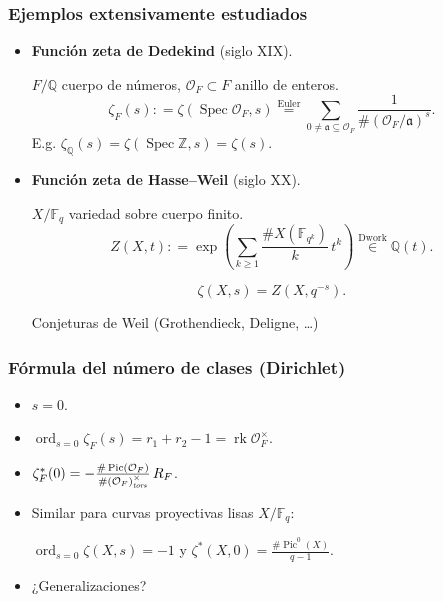 \documentclass[handout]{beamer}
\newcommand{\FF}{\mathbb{F}}
\newcommand{\QQ}{\mathbb{Q}}
\newcommand{\ZZ}{\mathbb{Z}}
\newcommand{\dfn}{\mathrel{\mathop:}=}
\DeclareMathOperator{\ord}{ord}
\DeclareMathOperator{\Pic}{Pic}
\DeclareMathOperator{\rk}{rk}
\DeclareMathOperator{\Spec}{Spec}
\newcommand{\tors}{\text{\it tors}}
\begin{document}
\begin{frame}
  \frametitle{Ejemplos extensivamente estudiados}

  \begin{itemize}
  \item<2-> \textbf{Función zeta de Dedekind} (siglo XIX).

    $F/\QQ$ cuerpo de números, $\mathcal{O}_F \subset F$ anillo de enteros.
    \[ \zeta_F (s) \dfn \zeta (\Spec \mathcal{O}_F, s) \stackrel{\text{Euler}}{=} \sum_{0 \ne \mathfrak{a} \subseteq \mathcal{O}_F} \frac{1}{\# (\mathcal{O}_F/\mathfrak{a})^s}. \]
    E.g. $\zeta_\QQ (s) = \zeta (\Spec \ZZ, s) = \zeta (s)$.

  \item<3-> \textbf{Función zeta de Hasse--Weil} (siglo XX).

    $X/\FF_q$ variedad sobre cuerpo finito.
    \[ Z (X,t) \dfn \exp \left(\sum_{k\ge 1} \frac{\# X (\FF_{q^k})}{k}\,t^k\right) \stackrel{\text{Dwork}}{\in} \QQ (t). \]

    \[ \zeta (X,s) = Z (X,q^{-s}). \]

    Conjeturas de Weil (Grothendieck, Deligne, \dots)
  \end{itemize}
\end{frame}


\begin{frame}
  \frametitle{Fórmula del número de clases (Dirichlet)}

  \begin{itemize}
  \item<2-> $s = 0$.

  \item<3-> $\ord_{s = 0} \zeta_F (s) = r_1 + r_2 - 1 = \rk \mathcal{O}_F^\times$.

  \item<4-> $\zeta_F^* (0) = -\frac{\# \Pic (\mathcal{O}_F)}{\# (\mathcal{O}_F)^\times_\tors}\,R_F$.

  \item<5-> Similar para curvas proyectivas lisas $X/\FF_q$:

    $\ord_{s = 0} \zeta (X,s) = -1$ y
    $\zeta^* (X,0) = \frac{\# \Pic^0 (X)}{q-1}$.




  \item<6-> ¿Generalizaciones?
  \end{itemize}
\end{frame}
\end{document}
